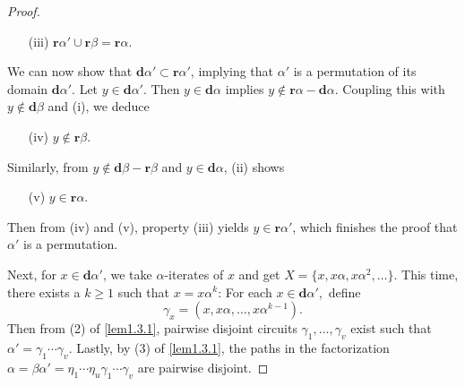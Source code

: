 \documentclass{surv-l}
\numberwithin{equation}{section}
\numberwithin{table}{section}
\numberwithin{figure}{section}
\theoremstyle{plain}
\theoremstyle{definition}
\begin{document}
\begin{proof}
\begin{enumerate}
\item[(iii)] $\mathbf{r}\alpha'\cup \mathbf{r}\beta=\mathbf{r}\alpha$.
\end{enumerate}
We can now show that $\mathbf{d}\alpha'\subset
\mathbf{r}\alpha'$, implying that $\alpha'$ is a
permutation of its domain $\mathbf{d}\alpha'$. Let $y\in
\mathbf{d}\alpha'$. Then $ y\in \mathbf{d}\alpha$ implies
$y\not\in \mathbf{r}\alpha-\mathbf{d}\alpha$. Coupling
this with $ y\not\in \mathbf{d}\beta$ and (i), we deduce
\begin{enumerate}
\item[(iv)] $y\not\in \mathbf{r}\beta$.
\end{enumerate}
Similarly, from $ y\not\in
\mathbf{d}\beta-\mathbf{r}\beta$ and $y\in
\mathbf{d}\alpha$, (ii) shows
\begin{enumerate}
\item[(v)] $ y\in \mathbf{r}\alpha$.
\end{enumerate}
Then from (iv) and (v), property (iii) yields $y\in
\mathbf{r}\alpha'$, which finishes the proof that $\alpha'$ is a
permutation.

Next, for $x\in \mathbf{d}\alpha'$, we take $\alpha$-iterates
of $x$ and get $X=\{x,x\alpha,x\alpha^{2},\ldots\}$. This
time, there exists a $k\geq 1$ such that $x=x\alpha^{k}$: For
each $x\in \mathbf{d}\alpha'$,~define
\[
\gamma_{x}=(x,x\alpha,\ldots, x\alpha^{k-1}).
\]
Then from (2) of \ref{lem1.3.1}, pairwise disjoint circuits
$\gamma_{1},\ldots, \gamma_{v}$ exist such that
$\alpha'=\gamma_{1}\cdots\gamma_{v}$. Lastly, by (3) of
\ref{lem1.3.1}, the paths in the factorization
$\alpha=\beta\alpha'=
\eta_{1}\cdots\eta_{u}\gamma_{1}\cdots\gamma_{v}$ are pairwise
disjoint.


\end{proof}
\end{document}
